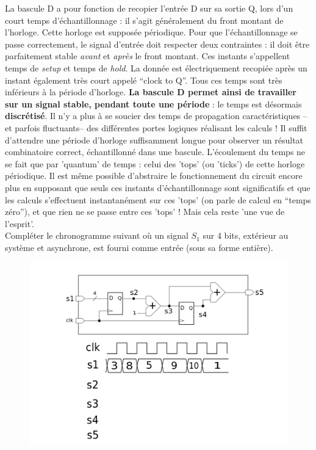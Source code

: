 \documentclass[a4paper,11pt]{article}
\begin{document}
La bascule D a pour fonction de recopier l'entrée D sur sa sortie Q, lors d'un court temps d'échantillonnage : il s'agit généralement du front montant de l'horloge. Cette horloge est supposée périodique. Pour que l'échantillonnage se passe correctement, le signal d'entrée doit respecter deux contraintes : il doit être parfaitement stable {\it avant} et {\it après} le front montant. Ces instants s'appellent temps de {\it setup} et temps de {\it hold}. La donnée est électriquement recopiée après un instant également très court appelé ``clock to Q''. Tous ces temps sont très inférieurs à la période d'horloge. {\bf La bascule D permet ainsi de travailler sur un signal stable, pendant toute une période} : le temps est désormais {\bf discrétisé}. Il n'y a plus à se soucier des temps de propagation caractéristiques -- et parfois fluctuants-- des différentes portes logiques réalisant les calculs ! Il suffit d'attendre une période d'horloge suffisamment longue pour observer un résultat combinatoire correct, échantillonné dans une bascule. L'écoulement du temps ne se fait que par 'quantum' de temps : celui des 'tops' (ou 'ticks') de cette horloge périodique. Il est même possible d'abstraire le fonctionnement du circuit encore plus en supposant que seuls ces instants d'échantillonnage sont significatifs et que les calculs s'effectuent instantanément sur ces 'tops' (on parle de calcul en ``temps zéro''), et que rien ne se passe entre ces 'tops' ! Mais cela reste 'une vue de l'esprit'.\\

Compléter le chronogramme suivant où un signal $S_1$ sur 4 bits, extérieur au système et asynchrone, est fourni comme entrée (sous sa forme entière).

\begin{figure}[!h]
\begin{center}
\includegraphics[scale=0.4]{./figures/dff-1.png}
\end{center}
\end{figure}
\end{document}
